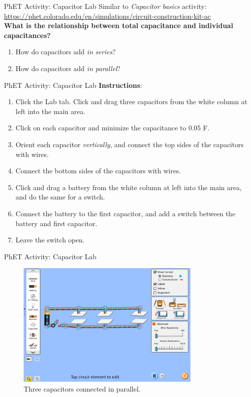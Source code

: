 \documentclass{beamer}
\begin{document}
\begin{frame}{PhET Activity: Capacitor Lab}
Similar to \textit{Capacitor basics} activity: \\ \vspace{0.5cm}
\url{https://phet.colorado.edu/en/simulations/circuit-construction-kit-ac} \\ \vspace{0.5cm}
\textbf{What is the relationship between total capacitance and individual capacitances?}
\begin{enumerate}
\item How do capacitors add \textit{in series}?
\item How do capacitors add \textit{in parallel}?
\end{enumerate}
\end{frame}

\begin{frame}{PhET Activity: Capacitor Lab}
\small
\textbf{Instructions}:
\begin{enumerate}
\item Click the Lab tab.  Click and drag three capacitors from the white column at left into the main area.
\item Click on each capacitor and minimize the capacitance to 0.05 F.
\item Orient each capacitor \textit{vertically}, and connect the top sides of the capacitors with wires.
\item Connect the bottom sides of the capacitors with wires.
\item Click and drag a battery from the white column at left into the main area, and do the same for a switch.
\item Connect the battery to the first capacitor, and add a switch between the battery and first capacitor.
\item Leave the switch open.
\end{enumerate}
\end{frame}


\begin{frame}{PhET Activity: Capacitor Lab}
\begin{figure}
\centering
\includegraphics[width=0.8\textwidth]{figures/three_cap.png}
\caption{\label{fig:phet_cap} Three capacitors connected in parallel.}
\end{figure}
\end{frame}
\end{document}
